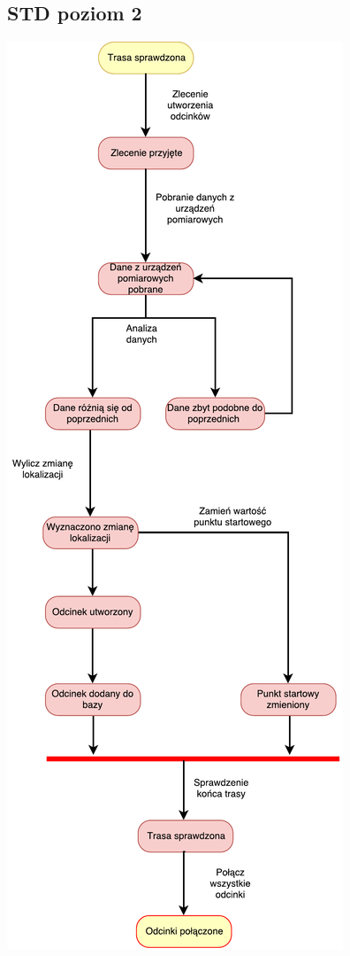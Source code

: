 \documentclass[11pt]{article}
\begin{document}
	\subsection{STD poziom 2}
	\begin{center}
		\includegraphics[scale=0.75]{STD4.pdf}
	\end{center}
\end{document}
